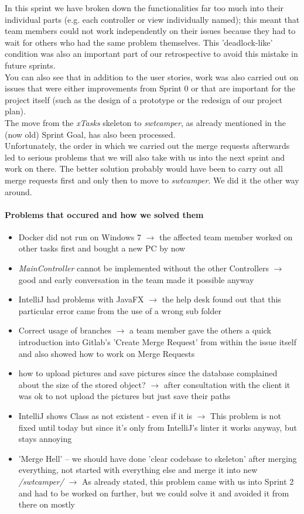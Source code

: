 In this sprint we have broken down the functionalities far too much into their individual parts (e.g. each controller or view individually named); this meant that team members could not work independently on their issues because they had to wait for others who had the same problem themselves. This 'deadlock-like' condition was also an important part of our retrospective to avoid this mistake in future sprints. \\
You can also see that in addition to the user stories, work was also carried out on issues that were either improvements from Sprint 0 or that are important for the project itself (such as the design of a prototype or the redesign of our project plan). \\
The move from the \textit{xTasks} skeleton to \textit{swtcamper}, as already mentioned in the (now old) Sprint Goal, has also been processed. \\
Unfortunately, the order in which we carried out the merge requests afterwards led to serious problems that we will also take with us into the next sprint and work on there. The better solution probably would have been to carry out all merge requests first and only then to move to \textit{swtcamper}. We did it the other way around.

\paragraph{Problems that occured and how we solved them}

\begin{itemize}
    \item Docker did not run on Windows 7 $\rightarrow$ the affected team member worked on other tasks first and bought a new PC by now
    \item \textit{MainController} cannot be implemented without the other Controllers $\rightarrow$ good and early conversation in the team made it possible anyway
    \item IntelliJ had problems with JavaFX $\rightarrow$ the help desk found out that this particular error came from the use of a wrong
    sub folder
    \item Correct usage of branches $\rightarrow$ a team member gave the others a quick introduction into Gitlab's 'Create Merge Request' from within the issue itself and also showed how to work on Merge Requests
    \item how to upload pictures and save pictures since the database complained about the size of the stored object? $\rightarrow$ after consultation with the client it was ok to not upload the pictures but just save their paths
    \item IntelliJ shows Class as not existent - even if it is $\rightarrow$ This problem is not fixed until today but since it's only from IntelliJ's linter it works anyway, but stays annoying
    \item 'Merge Hell' – we should have done 'clear codebase to skeleton' after merging everything, not started with everything else and merge it into new \textit{/swtcamper/} $\rightarrow$ As already stated, this problem came with us into Sprint 2 and had to be worked on further, but we could solve it and avoided it from there on mostly
\end{itemize}